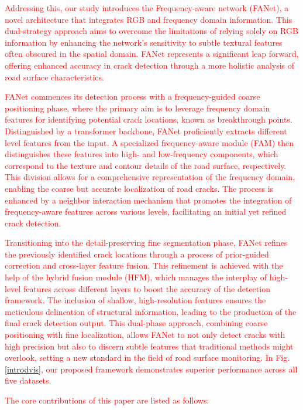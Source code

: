 \documentclass[lettersize,journal,onecolumn,12pt]{IEEEtran}
\begin{document}

\textcolor{red}{Addressing this, our study introduces the Frequency-aware network (FANet), a novel architecture that integrates RGB and frequency domain information. This dual-strategy approach aims to overcome the limitations of relying solely on RGB information by enhancing the network's sensitivity to subtle textural features often obscured in the spatial domain. FANet represents a significant leap forward, offering enhanced accuracy in crack detection through a more holistic analysis of road surface characteristics.}

\textcolor{red}{FANet commences its detection process with a frequency-guided coarse positioning phase, where the primary aim is to leverage frequency domain features for identifying potential crack locations, known as breakthrough points. Distinguished by a transformer backbone, FANet proficiently extracts different level features from the input. A specialized frequency-aware module (FAM) then distinguishes these features into high- and low-frequency components, which correspond to the texture and contour details of the road surface, respectively. This division allows for a comprehensive representation of the frequency domain, enabling the coarse but accurate localization of road cracks. The process is enhanced by a neighbor interaction mechanism that promotes the integration of frequency-aware features across various levels, facilitating an initial yet refined crack detection.}

\textcolor{red}{Transitioning into the detail-preserving fine segmentation phase, FANet refines the previously identified crack locations through a process of prior-guided correction and cross-layer feature fusion. This refinement is achieved with the help of the hybrid fusion module (HFM), which manages the interplay of high-level features across different layers to boost the accuracy of the detection framework. The inclusion of shallow, high-resolution features ensures the meticulous delineation of structural information, leading to the production of the final crack detection output. This dual-phase approach, combining coarse positioning with fine localization, allows FANet to not only detect cracks with high precision but also to discern subtle features that traditional methods might overlook, setting a new standard in the field of road surface monitoring. In Fig. \ref{introdvis}, our proposed framework demonstrates superior performance across all five datasets. }

\textcolor{red}{The core contributions of this paper are listed as follows:}
\end{document}
